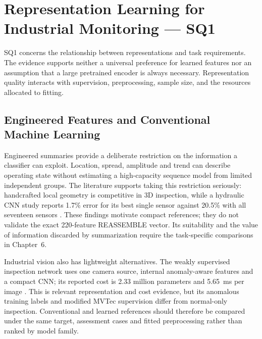 \section{Representation Learning for Industrial Monitoring --- SQ1}

SQ1 concerns the relationship between representations and task requirements. The evidence supports neither a universal preference for learned features nor an assumption that a large pretrained encoder is always necessary. Representation quality interacts with supervision, preprocessing, sample size, and the resources allocated to fitting.

\subsection{Engineered Features and Conventional Machine Learning}
Engineered summaries provide a deliberate restriction on the information a classifier can exploit. Location, spread, amplitude and trend can describe operating state without estimating a high-capacity sequence model from limited independent groups. The literature supports taking this restriction seriously: handcrafted local geometry is competitive in 3D inspection, while a hydraulic CNN study reports 1.7\% error for its best single sensor against 20.5\% with all seventeen sensors \citep{Horwitz2023Back,Goodarzi2023Deep}. These findings motivate compact references; they do not validate the exact 220-feature REASSEMBLE vector. Its suitability and the value of information discarded by summarization require the task-specific comparisons in Chapter~6.

Industrial vision also has lightweight alternatives. The weakly supervised inspection network uses one camera source, internal anomaly-aware features and a compact CNN; its reported cost is 2.33 million parameters and 5.65~ms per image \citep[PDF p.~10, Table~V]{P035}. This is relevant representation and cost evidence, but its anomalous training labels and modified MVTec supervision differ from normal-only inspection. Conventional and learned references should therefore be compared under the same target, assessment cases and fitted preprocessing rather than ranked by model family.

